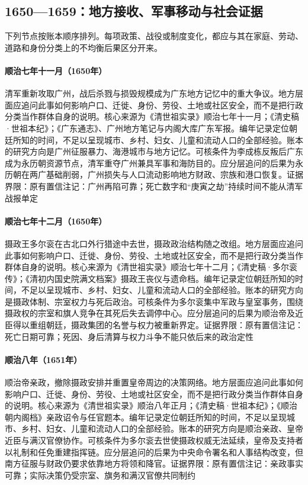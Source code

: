 \subsection{1650—1659：地方接收、军事移动与社会证据}
下列节点按账本顺序排列。每项政策、战役或制度变化，都应与其在家庭、劳动、道路和身份分类上的不均衡后果区分开来。
\hypertarget{social:EQ-1650-GUANGZHOU}{}\paragraph{顺治七年十一月（1650年）}清军重新攻取广州，战后杀戮与损毁规模成为广东地方记忆中的重大争议。地方层面应追问此事如何影响户口、迁徙、身份、劳役、土地或社区安全，而不是把行政分类当作群体自身的说明。核心来源为《清世祖实录》顺治七年十一月；《清史稿·世祖本纪》；《广东通志》、广州地方笔记与内阁大库广东军报。编年记录定位朝廷所知的时间，不足以呈现城市、乡村、妇女、儿童和流动人口的全部经验。账本的研究方向是广州征服暴力、海港城市与地方记忆。可核条件为李成栋反叛后广东成为永历朝资源节点，清军重夺广州兼具军事和海防目的。应分层追问的后果为永历朝在两广基础削弱，广州损失与人口流动影响地方财政、宗族和港口恢复。证据界限：原有置信注记：广州再陷可靠；死亡数字和“庚寅之劫”持续时间不能从清军战报单定
\hypertarget{social:EQ-1650-DORGON-DEATH}{}\paragraph{顺治七年十二月（1650年）}摄政王多尔衮在古北口外行猎途中去世，摄政政治结构随之改组。地方层面应追问此事如何影响户口、迁徙、身份、劳役、土地或社区安全，而不是把行政分类当作群体自身的说明。核心来源为《清世祖实录》顺治七年十二月；《清史稿·多尔衮传》；《清初内国史院满文档案》摄政王丧仪与遗命档。编年记录定位朝廷所知的时间，不足以呈现城市、乡村、妇女、儿童和流动人口的全部经验。账本的研究方向是摄政体制、宗室权力与死后政治。可核条件为多尔衮集中军政与皇室事务，围绕摄政权的宗室和旗人竞争在其死后失去调停中心。应分层追问的后果为顺治帝及近臣得以重组朝廷，摄政集团的名誉与权力被重新界定。证据界限：原有置信注记：死亡日期可靠；死因、身后清算与权力斗争不能只依后来的政治定性
\hypertarget{social:EQ-1651-SHUNZHI-PERSONAL-RULE}{}\paragraph{顺治八年（1651年）}顺治帝亲政，撤除摄政安排并重置皇帝周边的决策网络。地方层面应追问此事如何影响户口、迁徙、身份、劳役、土地或社区安全，而不是把行政分类当作群体自身的说明。核心来源为《清世祖实录》顺治八年正月；《清史稿·世祖本纪》；《顺治朝内阁档》亲政诏令与任官题本。编年记录定位朝廷所知的时间，不足以呈现城市、乡村、妇女、儿童和流动人口的全部经验。账本的研究方向是顺治亲政、皇帝近臣与满汉官僚协作。可核条件为多尔衮去世使摄政权威无法延续，皇帝及支持者以礼制和任免重建指挥链。应分层追问的后果为中央命令署名和人事结构改变，但南方征服与财政仍要求依靠地方将领和降官。证据界限：原有置信注记：亲政事实可靠；实际决策仍受宗室、旗务和满汉官僚共同制约
